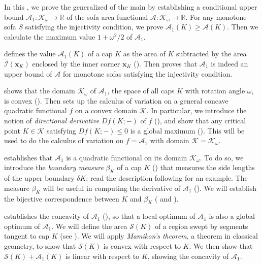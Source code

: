 In this , we prove the generalized  of the main  by establishing a conditional upper bound \(\mathcal{A}_1 : \mathcal{K}_\omega \to \mathbb{R}\) of the sofa area functional \(\mathcal{A} : \mathcal{K}_\omega \to \mathbb{R}\). For any monotone sofa \(S\) satisfying the injectivity condition, we prove \(\mathcal{A}_1(K) \geq \mathcal{A}(K)\). Then we calculate the maximum value \(1 + \omega^2/2\) of \(\mathcal{A}_1\).

 defines the value \(\mathcal{A}_1(K)\) of a cap \(K\) as the area of \(K\) subtracted by the area \(\mathcal{I}(\mathbf{x}_K)\) enclosed by the inner corner \(\mathbf{x}_K\) (). Then  proves that \(\mathcal{A}_1\) is indeed an upper bound of \(\mathcal{A}\) for monotone sofas satisfying the injectivity condition.

 shows that the domain \(\mathcal{K}_\omega\) of \(\mathcal{A}_1\), the space of all caps \(K\) with rotation angle \(\omega\), is convex (). Then  sets up the calculus of variation on a general concave quadratic functional \(f\) on a convex domain \(\mathcal{K}\). In particular, we introduce the notion of \emph{directional derivative} \(Df(K; -)\) of \(f\) (), and show that any critical point \(K \in \mathcal{K}\) satisfying \(D f(K; -) \leq 0\) is a global maximum (). This will be used to do the calculus of variation on \(f = \mathcal{A}_1\) with domain \(\mathcal{K} = \mathcal{K}_\omega\).

 establishes that \(\mathcal{A}_1\) is a quadratic functional on its domain \(\mathcal{K}_\omega\). To do so, we introduce the \emph{boundary measure} \(\beta_K\) of a cap \(K\) () that measures the side lengths of the upper boundary \(\delta K\); read the description following  for an example. The measure \(\beta_K\) will be useful in computing the derivative of \(\mathcal{A}_1\) (). We will establish the bijective correspondence between \(K\) and \(\beta_K\) ( and ).

 establishes the concavity of \(\mathcal{A}_1\) (), so that a local optimum of \(\mathcal{A}_1\) is also a global optimum of \(\mathcal{A}_1\). We will define the area \(\mathcal{S}(K)\) of a region swept by segments tangent to cap \(K\) (see ). We will apply \emph{Mamikon’s theorem}, a theorem in classical geometry, to show that \(\mathcal{S}(K)\) is convex with respect to \(K\). We then show that \(\mathcal{S}(K) + \mathcal{A}_1(K)\) is linear with respect to \(K\), showing the concavity of \(\mathcal{A}_1\).

